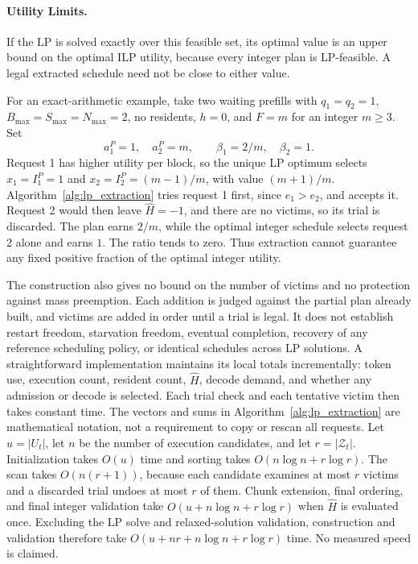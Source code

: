 \documentclass[11pt]{article}
\begin{document}
\paragraph{Utility Limits.}
If the LP is solved exactly over this feasible set, its optimal value is an upper bound on the optimal ILP utility, because every integer plan is LP-feasible. A legal extracted schedule need not be close to either value.

For an exact-arithmetic example, take two waiting prefills with \(q_1=q_2=1\), \(B_{\max}=S_{\max}=N_{\max}=2\), no residents, \(h=0\), and \(F=m\) for an integer \(m\ge3\). Set
\[
a_1^P=1,\quad a_2^P=m,\qquad \beta_1=2/m,\quad\beta_2=1.
\]
Request 1 has higher utility per block, so the unique LP optimum selects \(x_1=I_1^P=1\) and \(x_2=I_2^P=(m-1)/m\), with value \((m+1)/m\). Algorithm~\ref{alg:lp_extraction} tries request 1 first, since \(e_1>e_2\), and accepts it. Request 2 would then leave \(\hat H=-1\), and there are no victims, so its trial is discarded. The plan earns \(2/m\), while the optimal integer schedule selects request 2 alone and earns \(1\). The ratio tends to zero. Thus extraction cannot guarantee any fixed positive fraction of the optimal integer utility.

The construction also gives no bound on the number of victims and no protection against mass preemption. Each addition is judged against the partial plan already built, and victims are added in order until a trial is legal. It does not establish restart freedom, starvation freedom, eventual completion, recovery of any reference scheduling policy, or identical schedules across LP solutions. A straightforward implementation maintains its local totals incrementally: token use, execution count, resident count, \(\hat H\), decode demand, and whether any admission or decode is selected. Each trial check and each tentative victim then takes constant time. The vectors and sums in Algorithm~\ref{alg:lp_extraction} are mathematical notation, not a requirement to copy or rescan all requests. Let \(u=|U_t|\), let \(n\) be the number of execution candidates, and let \(r=|\mathcal{Z}_t|\). Initialization takes \(O(u)\) time and sorting takes \(O(n\log n+r\log r)\). The scan takes \(O(n(r+1))\), because each candidate examines at most \(r\) victims and a discarded trial undoes at most \(r\) of them. Chunk extension, final ordering, and final integer validation take \(O(u+n\log n+r\log r)\) when \(\hat H\) is evaluated once. Excluding the LP solve and relaxed-solution validation, construction and validation therefore take \(O(u+nr+n\log n+r\log r)\) time. No measured speed is claimed.
\end{document}
